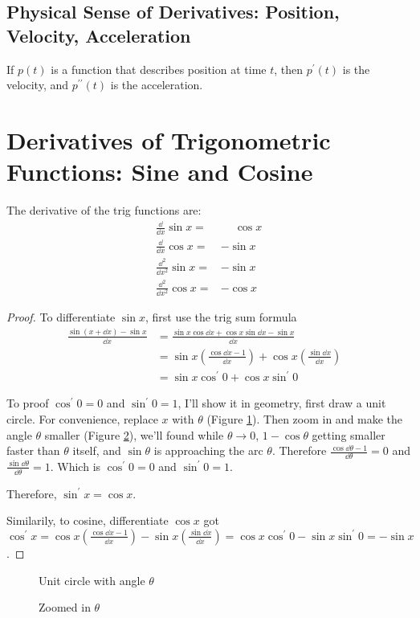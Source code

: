 \subsection{Physical Sense of Derivatives: Position, Velocity, Acceleration}
If $p(t)$ is a function that describes position at time $t$, then $p^\prime(t)$ is the velocity, and $p^{\prime\prime}(t)$ is the acceleration.

\section{Derivatives of Trigonometric Functions: Sine and Cosine}
The derivative of the trig functions are:
\begin{align*}
  \frac\dd{\dd x}\sin x=       & \mathbin{\phantom-}\cos x\\
  \frac\dd{\dd x}\cos x=       & -\sin x\\
  \frac{\dd^2}{\dd x^2}\sin x= & -\sin x\\
  \frac{\dd^2}{\dd x^2}\cos x= & -\cos x
\end{align*}
\begin{proof}
To differentiate $\sin x$, first use the trig sum formula
\begin{align*}
  \frac{\sin(x+\dd x)-\sin x}{\dd x} & =\frac{\sin x\cos\dd x+\cos x\sin\dd x-\sin x}{\dd x} & \\
  & =\sin x\left(\frac{\cos\dd x-1}{\dd x}\right)+\cos x\left(\frac{\sin\dd x}{\dd x}\right)\\
  & =\sin x\cos^\prime0+\cos x\sin^\prime0
\end{align*}

To proof $\cos^\prime0=0$ and $\sin^\prime0=1$, I'll show it in geometry, first draw a unit circle. For convenience, replace $x$ with $\theta$ (Figure \ref{fig:1}). Then zoom in and make the angle $\theta$ smaller (Figure \ref{fig:2}), we'll found while $\theta\to0$, $1-\cos\theta$ getting smaller faster than $\theta$ itself, and \(\sin\theta\) is approaching the arc $\theta$. Therefore $\frac{\cos\dd\theta-1}{\dd\theta}=0$ and $\frac{\sin\dd\theta}{\dd\theta}=1$. Which is $\cos^\prime0=0$ and $\sin^\prime0=1$.

Therefore, $\sin^\prime x=\cos x$.

Similarily, to cosine, differentiate $\cos x$ got $\cos^\prime x=\cos x\left(\frac{\cos\dd x-1}{\dd x}\right)-\sin x\left(\frac{\sin\dd x}{\dd x}\right)=\cos x\cos^\prime 0-\sin x\sin^\prime 0=-\sin x$.
\end{proof}
\begin{figure}[H]
  \centering
  \caption{Unit circle with angle $\theta$}
  \label{fig:1}
\end{figure}
\begin{figure}[H]
  \centering
  \caption{Zoomed in $\theta$}
  \label{fig:2}
\end{figure}

